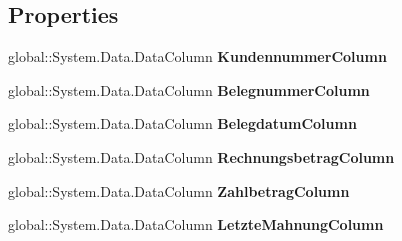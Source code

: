 \subsection*{Properties}
\begin{DoxyCompactItemize}
\item 
global\+::\+System.\+Data.\+Data\+Column {\bfseries Kundennummer\+Column}\hypertarget{class_products_1_1_data_1_1ds_sage_1_1_invoice_data_table_a2923a100c588e91f751d17e49c52efa4}{}\label{class_products_1_1_data_1_1ds_sage_1_1_invoice_data_table_a2923a100c588e91f751d17e49c52efa4}

\item 
global\+::\+System.\+Data.\+Data\+Column {\bfseries Belegnummer\+Column}\hypertarget{class_products_1_1_data_1_1ds_sage_1_1_invoice_data_table_ac8a35877806d68dc90bdca7db9dff936}{}\label{class_products_1_1_data_1_1ds_sage_1_1_invoice_data_table_ac8a35877806d68dc90bdca7db9dff936}

\item 
global\+::\+System.\+Data.\+Data\+Column {\bfseries Belegdatum\+Column}\hypertarget{class_products_1_1_data_1_1ds_sage_1_1_invoice_data_table_ae7494a1a3ad115e87fdb2a8ada5dffa2}{}\label{class_products_1_1_data_1_1ds_sage_1_1_invoice_data_table_ae7494a1a3ad115e87fdb2a8ada5dffa2}

\item 
global\+::\+System.\+Data.\+Data\+Column {\bfseries Rechnungsbetrag\+Column}\hypertarget{class_products_1_1_data_1_1ds_sage_1_1_invoice_data_table_a7aecb06ca4470311cf1623400c8fed6e}{}\label{class_products_1_1_data_1_1ds_sage_1_1_invoice_data_table_a7aecb06ca4470311cf1623400c8fed6e}

\item 
global\+::\+System.\+Data.\+Data\+Column {\bfseries Zahlbetrag\+Column}\hypertarget{class_products_1_1_data_1_1ds_sage_1_1_invoice_data_table_a73b9137ae25150ecde946273803b55e8}{}\label{class_products_1_1_data_1_1ds_sage_1_1_invoice_data_table_a73b9137ae25150ecde946273803b55e8}

\item 
global\+::\+System.\+Data.\+Data\+Column {\bfseries Letzte\+Mahnung\+Column}\hypertarget{class_products_1_1_data_1_1ds_sage_1_1_invoice_data_table_ab97f3bbeeb3778cdf6fd7f64722f7d0a}{}\label{class_products_1_1_data_1_1ds_sage_1_1_invoice_data_table_ab97f3bbeeb3778cdf6fd7f64722f7d0a}


\end{DoxyCompactItemize}
